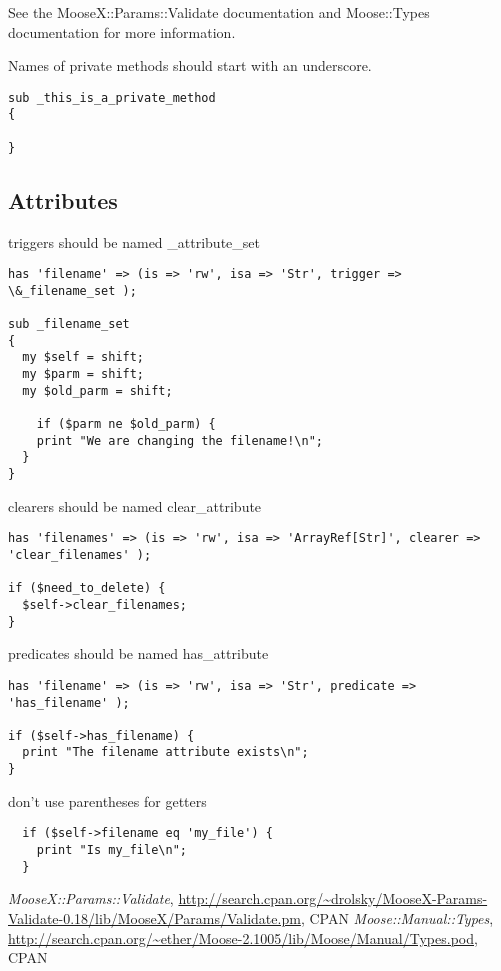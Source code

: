 See the MooseX::Params::Validate documentation \cite{params} and Moose::Types documentation \cite{types} for more information.

Names of private methods should start with an underscore.
\begin{verbatim}
sub _this_is_a_private_method
{

}
\end{verbatim}


\subsection{Attributes}
triggers should be named \_attribute\_set
\begin{verbatim}
has 'filename' => (is => 'rw', isa => 'Str', trigger => \&_filename_set );

sub _filename_set
{
  my $self = shift;
  my $parm = shift;
  my $old_parm = shift;

	if ($parm ne $old_parm) {
    print "We are changing the filename!\n";
  }
}
\end{verbatim}

clearers should be named clear\_attribute
\begin{verbatim}
has 'filenames' => (is => 'rw', isa => 'ArrayRef[Str]', clearer => 'clear_filenames' );

if ($need_to_delete) {
  $self->clear_filenames;
}
\end{verbatim}

predicates should be named has\_attribute
\begin{verbatim}
has 'filename' => (is => 'rw', isa => 'Str', predicate => 'has_filename' );

if ($self->has_filename) {
  print "The filename attribute exists\n";
}
\end{verbatim}

don't use parentheses for getters
\begin{verbatim}
  if ($self->filename eq 'my_file') {
    print "Is my_file\n";
  }
\end{verbatim}

\begin{thebibliography}{1}
	 {\em MooseX::Params::Validate}, \url{http://search.cpan.org/\~drolsky/MooseX-Params-Validate-0.18/lib/MooseX/Params/Validate.pm}, CPAN
	 {\em Moose::Manual::Types}, \url{http://search.cpan.org/~ether/Moose-2.1005/lib/Moose/Manual/Types.pod}, CPAN
\end{thebibliography}



